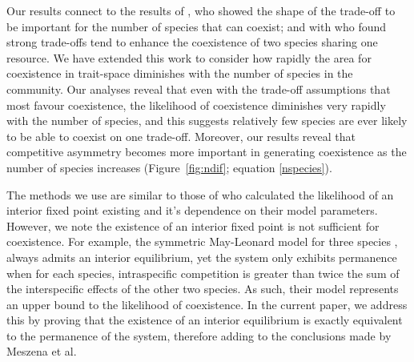 Our results connect  to the results of \cite{adler2000space}, who showed the shape of the trade-off to be important for the number of species that can coexist; and with \cite{hillerislambers2003competition} who found strong trade-offs tend to enhance the coexistence of two species sharing one resource. We have extended this work to consider how rapidly the area for coexistence in trait-space diminishes with the number of species in the community. Our analyses reveal that even with the trade-off assumptions that most favour coexistence, the likelihood of coexistence diminishes very rapidly with the number of species, and this suggests relatively few species are ever likely to be able to coexist on one trade-off. Moreover, our results reveal that competitive asymmetry becomes more important in generating coexistence as the number of species increases (Figure~\ref{fig:ndif}; equation \eqref{nspecies}).

The methods we use are similar to those of \cite{meszena2006competitive} who calculated the likelihood of an interior fixed point existing and it's dependence on their model parameters. However, we note the existence of an interior fixed point is not sufficient for coexistence. For example, the symmetric May-Leonard model for three species \citep{may1975nonlinear}, always admits an interior equilibrium, yet the system only exhibits permanence when for each species, intraspecific competition is greater than twice the sum of the interspecific effects of the other two species. As such, their model represents an upper bound to the likelihood of coexistence. In the current paper, we address this by proving that the existence of an interior equilibrium is exactly equivalent to the permanence of the system, therefore adding to the conclusions made by Meszena et al.

